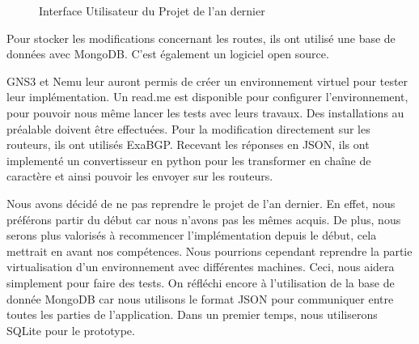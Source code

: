 \begin{figure}[H]
\caption{Interface Utilisateur du Projet de l'an dernier}
\label{fig:meteor_route}
\end{figure}

Pour stocker les modifications concernant les routes, ils ont utilisé une base de données avec MongoDB. C'est également un logiciel open source.

GNS3 et Nemu leur auront permis de créer un environnement virtuel pour tester leur implémentation. Un read.me est disponible pour configurer l'environnement, pour pouvoir nous même lancer les tests avec leurs travaux. Des installations au préalable doivent être effectuées.
Pour la modification directement sur les routeurs, ils ont utilisés ExaBGP. Recevant les réponses en JSON, ils ont implementé un convertisseur en python pour les transformer en chaîne de caractère et ainsi pouvoir les envoyer sur les routeurs.

Nous avons décidé de ne pas reprendre le projet de l'an dernier. En effet, nous préférons partir du début car nous n'avons pas les mêmes acquis. De plus, nous serons plus valorisés à recommencer l'implémentation depuis le début, cela mettrait en avant nos compétences. Nous pourrions cependant reprendre la partie virtualisation d'un environnement avec différentes machines. Ceci, nous aidera simplement pour faire des tests. On réfléchi encore à l'utilisation de la base de donnée MongoDB car nous utilisons le format JSON pour communiquer entre toutes les parties de l'application. Dans un premier temps, nous utiliserons SQLite pour le prototype.
